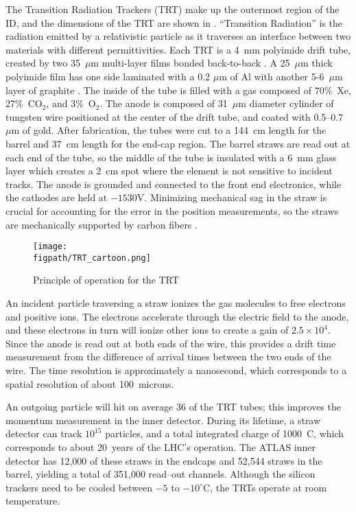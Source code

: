 The Transition Radiation Trackers (TRT) make up the outermost region of the ID, and the dimensions of the TRT are shown in .  ``Transition Radiation'' is the radiation emitted by a relativistic particle as it traverses an interface between two materials with different permittivities.
Each TRT is a 4~mm polyimide drift tube, created by two 35~$\mu$m multi-layer films bonded back-to-back \cite{ATLAS_long}.  
A 25~$\mu$m thick polyimide film has one side laminated with a 0.2 $\mu$m of Al with another 5-6~$\mu$m layer of graphite \cite{ATLAS_long}. 
The inside of the tube is filled with a gas composed of 70\%~Xe, 27\%~CO$_2$, and 3\%~O$_2$. 
The anode is composed of 31~$\mu$m diameter cylinder of tungsten wire positioned at the center of the drift tube, and coated with 0.5--0.7~$\mu$m of gold.
After fabrication, the tubes were cut to a 144~cm length for the barrel and 37~cm length for the end-cap region.  
The barrel straws are read out at each end of the tube, so the middle of the tube is insulated with a 6~mm glass layer which creates a 2~cm spot where the element is not sensitive to incident tracks.
The anode is grounded and connected to the front end electronics, while the cathodes are held at $-1530$V.  Minimizing mechanical sag in the straw is crucial for accounting for the error in the position measurements, so the straws are mechanically supported by carbon fibers \cite{ATLAS_long}.

\begin{figure}[h!tbp]
\centering
\texttt{[image: \\figpath/TRT\_cartoon.png]}
\caption{Principle of operation for the TRT~\cite{TRT}}
\label{GEANT_sim}
\end{figure}

An incident particle traversing a straw ionizes the gas molecules to free electrons and positive ions.  The electrons accelerate through the electric field to the anode, and these electrons in turn will ionize other ions to create a gain of $2.5\times10^4$.  Since the anode is read out at both ends of the wire, this provides a drift time measurement from the difference of arrival times between the two ends of the wire.  The time resolution is approximately a nanosecond, which corresponds to a spatial resolution of about 100~microns.  

An outgoing particle will hit on average 36 of the TRT tubes; this improves the momentum measurement in the inner detector.
During its lifetime, a straw detector can track $10^{15}$ particles, and a total integrated charge of 1000~C, which corresponds to about 20~years of the LHC's operation.  
The ATLAS inner detector has 12,000 of these straws in the endcaps and 52,544 straws in the barrel, yielding a total of 351,000 read--out channels.  Although the silicon trackers need to be cooled between $-5$ to $-10^\circ$C, the TRTs operate at room temperature.

